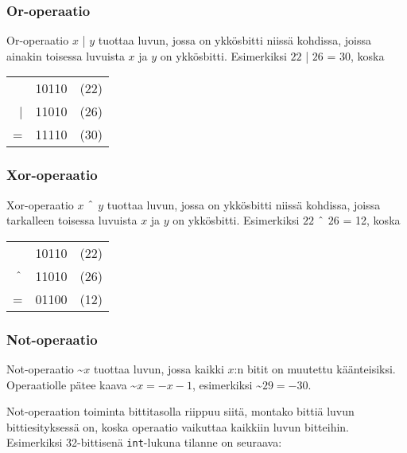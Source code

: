 \subsubsection{Or-operaatio}


Or-operaatio $x$ | $y$ tuottaa luvun,
jossa on ykkösbitti niissä kohdissa,
joissa ainakin toisessa luvuista $x$ ja $y$ on ykkösbitti.
Esimerkiksi $22$ | $26$ = 30, koska

\begin{center}
\begin{tabular}{rrr}
& 10110 & (22)\\
| & 11010 & (26) \\
\hline
 = & 11110 & (30) \\
\end{tabular}
\end{center}

\subsubsection{Xor-operaatio}


Xor-operaatio $x$ $\XOR$ $y$ tuottaa luvun,
jossa on ykkösbitti niissä kohdissa,
joissa tarkalleen toisessa luvuista $x$ ja $y$ on ykkösbitti.
Esimerkiksi $22$ $\XOR$ $26$ = 12, koska

\begin{center}
\begin{tabular}{rrr}
& 10110 & (22)\\
$\XOR$ & 11010 & (26) \\
\hline
 = & 01100 & (12) \\
\end{tabular}
\end{center}

\subsubsection{Not-operaatio}


Not-operaatio \textasciitilde$x$ tuottaa luvun,
jossa kaikki $x$:n bitit on muutettu käänteisiksi.
Operaatiolle pätee kaava \textasciitilde$x = -x-1$,
esimerkiksi \textasciitilde$29 = -30$.

Not-operaation toiminta bittitasolla riippuu siitä,
montako bittiä luvun bittiesityksessä on,
koska operaatio vaikuttaa kaikkiin luvun bitteihin.
Esimerkiksi 32-bittisenä \texttt{int}-lukuna
tilanne on seuraava:

